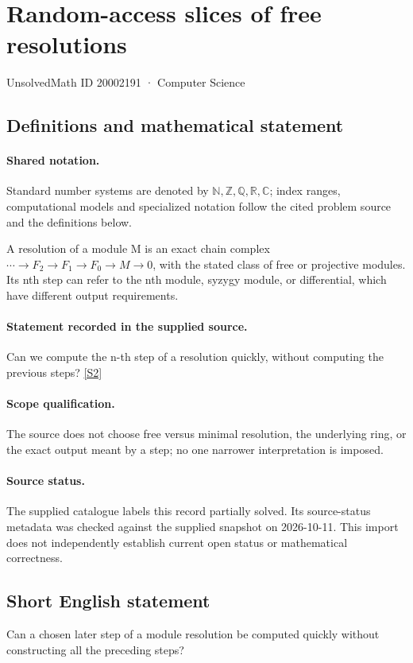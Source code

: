 \documentclass[11pt]{article}
\newcommand{\sref}[2]{\hyperlink{source:#1:#2}{[S#2]}}
\begin{document}
\setcounter{section}{20002190}
\section{Random-access slices of free resolutions}\label{20002191}
{\small\sffamily UnsolvedMath ID 20002191 · Computer Science}
\subsection{Definitions and mathematical statement}

\paragraph{Shared notation.}Standard number systems are denoted by $\mathbb N,\mathbb Z,\mathbb Q,\mathbb R,\mathbb C$; index ranges, computational models and specialized notation follow the cited problem source and the definitions below.


A resolution of a module M is an exact chain complex $\cdots\to F_2\to F_1\to F_0\to M\to0$, with the stated class of free or projective modules. Its nth step can refer to the nth module, syzygy module, or differential, which have different output requirements.
\paragraph{Statement recorded in the supplied source.}
Can we compute the n-th step of a resolution quickly, without computing the previous steps? \sref{20002191}{2}
\paragraph{Scope qualification.}
The source does not choose free versus minimal resolution, the underlying ring, or the exact output meant by a step; no one narrower interpretation is imposed.
\paragraph{Source status.}
The supplied catalogue labels this record partially solved. Its source-status metadata was checked against the supplied snapshot on 2026-10-11. This import does not independently establish current open status or mathematical correctness.
\subsection{Short English statement}
Can a chosen later step of a module resolution be computed quickly without constructing all the preceding steps?
\end{document}

